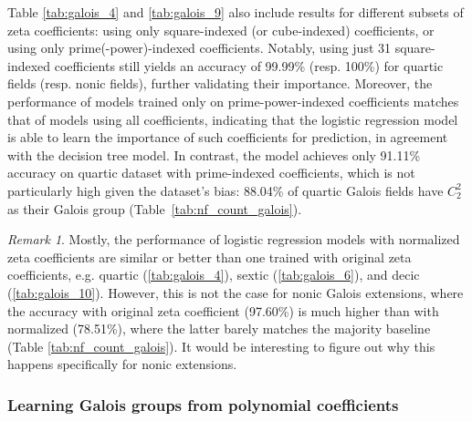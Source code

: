 \documentclass[letterpaper, 10pt]{article}
\newcommand{\1}{\mathds{1}}	%
\theoremstyle{definition}
\theoremstyle{remark}
\newtheorem{remark}[theorem]{Remark}
\begin{document}
Table \ref{tab:galois_4} and \ref{tab:galois_9} also include results for different subsets of zeta coefficients: using only square-indexed (or cube-indexed) coefficients, or using only prime(-power)-indexed coefficients.  
Notably, using just 31 square-indexed coefficients still yields an accuracy of 99.99\% (resp. 100\%) for quartic fields (resp. nonic fields), further validating their importance.  
Moreover, the performance of models trained only on prime-power-indexed coefficients matches that of models using all coefficients,
indicating that the logistic regression model is able to learn the importance of such coefficients for prediction, in agreement with the decision tree model.
In contrast, the model achieves only 91.11\% accuracy on quartic dataset with prime-indexed coefficients, which is not particularly high given the dataset's bias: 88.04\% of quartic Galois fields have \( C_2^2 \) as their Galois group (Table~\ref{tab:nf_count_galois}).

\begin{remark}
     Mostly, the performance of logistic regression models with normalized zeta coefficients are similar or better than one trained with original zeta coefficients, e.g. quartic (\ref{tab:galois_4}), sextic (\ref{tab:galois_6}), and decic (\ref{tab:galois_10}). However, this is not the case for nonic Galois extensions, where the accuracy with original zeta coefficient (97.60\%) is much higher than with normalized (78.51\%), where the latter barely matches the majority baseline (Table \ref{tab:nf_count_galois}). It would be interesting to figure out why this happens specifically for nonic extensions. 
\end{remark}

\subsubsection{Learning Galois groups from polynomial coefficients}
\label{subsubsec:49_poly}
\end{document}
